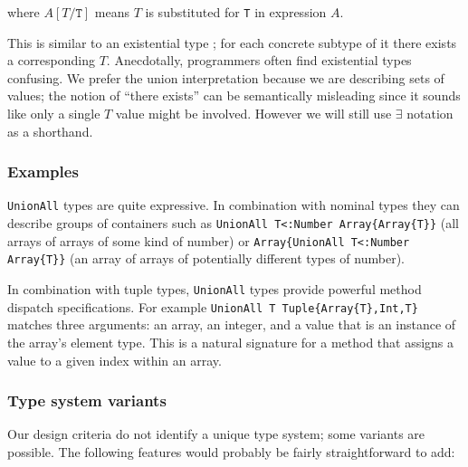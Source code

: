 \noindent
where $A[T/\texttt{T}]$ means $T$ is substituted for \texttt{T} in expression $A$.


This is similar to an existential type \cite{boundedquant};
for each concrete subtype of it there exists a corresponding $T$.
Anecdotally, programmers often find existential types confusing.
We prefer the union interpretation because we are describing sets of values;
the notion of ``there exists'' can be semantically misleading since it sounds like
only a single $T$ value might be involved.
However we will still use $\exists$ notation as a shorthand.



\subsubsection{Examples}

\texttt{UnionAll} types are quite expressive. In combination with nominal
types they can describe groups of containers such as
\texttt{UnionAll T<:Number Array\{Array\{T\}\}} (all arrays of arrays of
some kind of number) or
\texttt{Array\{UnionAll T<:Number Array\{T\}\}} (an array of arrays of
potentially different types of number).

In combination with tuple types, \texttt{UnionAll} types provide powerful
method dispatch specifications. For example
\texttt{UnionAll T Tuple\{Array\{T\},Int,T\}} matches three arguments:
an array, an integer, and a value that is an instance of the array's
element type. This is a natural signature for a method that assigns a
value to a given index within an array.

\subsubsection{Type system variants}

Our design criteria do not identify a unique type system; some
variants are possible.
The following features would probably be fairly straightforward to add:

